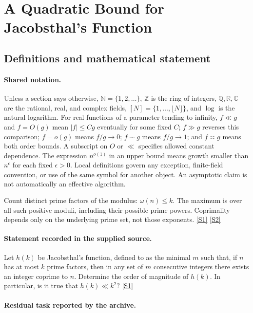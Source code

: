 \documentclass[11pt,a4paper]{article}
\newcommand{\N}{\mathbb{N}}
\newcommand{\Z}{\mathbb{Z}}
\newcommand{\Q}{\mathbb{Q}}
\newcommand{\R}{\mathbb{R}}
\newcommand{\C}{\mathbb{C}}
\newcommand{\sref}[2]{\hyperlink{source:#1:#2}{[S#2]}}
\begin{document}
\section{A Quadratic Bound for Jacobsthal's Function}\label{statement}


\subsection{Definitions and mathematical statement}

\paragraph{Shared notation.}Unless a section says otherwise, $\N=\{1,2,\ldots\}$,
$\Z$ is the ring of integers, $\Q,\R,\C$ are the rational, real, and complex
fields, $[N]=\{1,\ldots,\lfloor N\rfloor\}$, and $\log$ is the natural
logarithm. For real functions of a parameter tending to infinity,
$f\ll g$ and $f=O(g)$ mean $|f|\leq Cg$ eventually for some fixed $C$;
$f\gg g$ reverses this comparison; $f=o(g)$ means $f/g\to0$;
$f\sim g$ means $f/g\to1$; and $f\asymp g$ means both order bounds.
A subscript on $O$ or $\ll$ specifies allowed constant dependence.
The expression $n^{o(1)}$ in an upper bound means growth smaller than
$n^\epsilon$ for each fixed $\epsilon>0$. Local definitions govern any
exception, finite-field convention, or use of the same symbol for another
object. An asymptotic claim is not automatically an effective algorithm.



Count distinct prime factors of the modulus: $\omega(n)\leq k$. The maximum is over all such positive moduli, including their possible prime powers. Coprimality depends only on the underlying prime set, not those exponents. \sref{statement}{1} \sref{statement}{2}

\paragraph{Statement recorded in the supplied source.}
Let $h(k)$ be Jacobsthal's function, defined to as the minimal $m$ such that, if $n$ has at most $k$ prime factors, then in any set of $m$ consecutive integers there exists an integer coprime to $n$. Determine the order of magnitude of $h(k)$. In particular, is it true that $ h(k) \ll k^2? $ \sref{statement}{1}

\paragraph{Residual task reported by the archive.}
\end{document}
